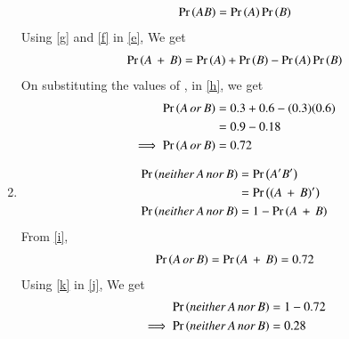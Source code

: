\documentclass[journal,12pt,twocolumn]{IEEEtran}
\begin{document}
\begin{enumerate}[label={\roman*)}]
\begin{align}
    \Pr\left(AB\right)=\Pr\left(A\right)\Pr\left(B\right)\label{g}
\end{align}
Using \eqref{g} and \eqref{f} in \eqref{e}, We get
\begin{align}
    \Pr\left(A\,+\,B\right) = \Pr\left(A\right) + \Pr\left(B\right) -\Pr\left(A\right)\Pr\left(B\right)\label{h}
\end{align}
On substituting the values of , in \eqref{h}, we get
\begin{align}
    \Pr\left(A\,or\,B\right) &= 0.3 + 0.6 -(0.3)(0.6)\\
    &= 0.9-0.18\\
    \implies \Pr\left(A\,or\,B\right) &= 0.72\label{i}
\end{align}
\item
\begin{align}
    \Pr\left(neither\, A\, nor\, B\right) &= \Pr\left(A'B'\right)\\
    &=\Pr\left((A\,+\,B)'\right)\\
    \Pr\left(neither\, A\, nor\, B\right)&=1-\Pr\left(A\,+\,B\right)\label{j}
\end{align}
From \eqref{i},
\begin{align}
    \Pr\left(A\,or\,B\right) =\Pr\left(A\,+\,B\right)=0.72\label{k}
\end{align}
Using \eqref{k} in \eqref{j}, We get
\begin{align}
    \Pr\left(neither\, A\, nor\, B\right)&=1-0.72\\
   \implies \Pr\left(neither\, A\, nor\, B\right)&=0.28
\end{align}
\end{enumerate}
\end{document}
